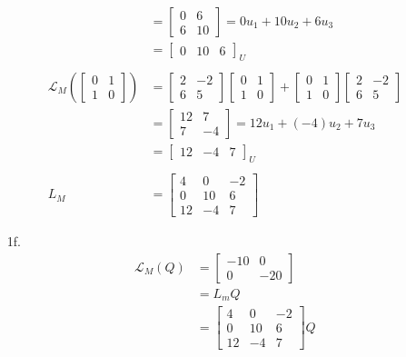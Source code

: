 \documentclass[12pt,fleqn,leqno,letterpaper]{article}
\begin{document}
\begin{enumerate}
\begin{align*}
				&= \begin{bmatrix} 0 & 6 \\ 6 & 10 \end{bmatrix} = 0 u_{1} + 10 u_{2} + 6 u_{3}\\
				&= \begin{bmatrix} 0 & 10 & 6 \end{bmatrix}_{U}\\\\
				\mathcal{L}_{M}\left(\begin{bmatrix} 0 & 1 \\ 1 & 0 \end{bmatrix}\right) &= \begin{bmatrix} 2 & -2 \\ 6 & 5 \end{bmatrix}^{} \begin{bmatrix} 0 & 1 \\ 1 & 0 \end{bmatrix} + \begin{bmatrix} 0 & 1 \\ 1 & 0 \end{bmatrix} \begin{bmatrix} 2 & -2 \\ 6 & 5 \end{bmatrix}\\
				&= \begin{bmatrix} 12 & 7 \\ 7 & -4 \end{bmatrix} = 12 u_{1} + (-4) u_{2} + 7 u_{3}\\
				&= \begin{bmatrix} 12 & -4 & 7 \end{bmatrix}_{U}\\\\
				L_{M} &= \begin{bmatrix}
				4 & 0 & -2\\
				0 & 10 & 6\\
				12 & -4 & 7
				\end{bmatrix}
			\end{align*}

		\newpage

		\item[1f.]
			\begin{align*}
				\mathcal{L}_{M}(Q) &= \begin{bmatrix} -10 & 0 \\ 0 & -20 \end{bmatrix}\\
				&= L_{m} Q\\
				&= \begin{bmatrix}
				4 & 0 & -2\\
				0 & 10 & 6\\
				12 & -4 & 7
				\end{bmatrix} Q \\
			\end{align*}
	\end{enumerate}
\end{document}
